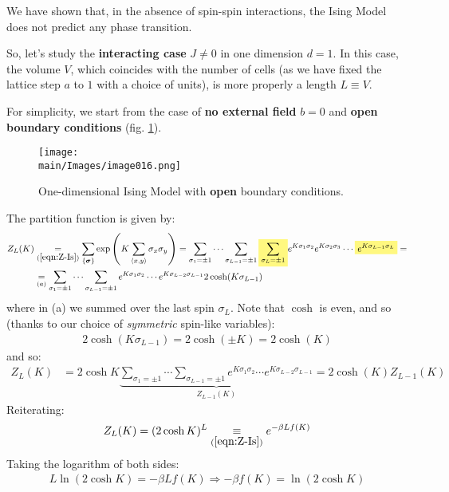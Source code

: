 \documentclass[../../main.tex]{subfiles}
\begin{document}

We have shown that, in the absence of spin-spin interactions, the Ising Model does not predict any phase transition. %

\medskip

So, let's study the \textbf{interacting case} $J\neq 0$ in one dimension $d=1$. In this case, the volume $V$, which coincides with the number of cells (as we have fixed the lattice step $a$ to $1$ with a choice of units), is more properly a length $L \equiv V$.

\medskip

For simplicity, we start from the case of \textbf{no external field} $b=0$ and \textbf{open boundary conditions} (fig. \ref{fig:obcd1}).   

\begin{figure}[H]
    \centering
    \texttt{[image: \\main/Images/image016.png]}
    \caption{One-dimensional Ising Model with \textbf{open} boundary conditions.\label{fig:obcd1}}
\end{figure}

The partition function is given by:
\begin{align*}
    Z_L(K) &\underset{(\ref{eqn:Z-Is})}{=} 
    \sum_{\{\bm{\sigma}\}}\exp\left( K \sum_{\langle x,y \rangle} \sigma_x \sigma_y \right) =
    \sum_{\sigma_1 = \pm 1} \cdots \sum_{\sigma_{L-1}=\pm 1} \hlc{Yellow}{\sum_{\sigma_L = \pm 1}} e^{K \sigma_1 \sigma_2} e^{K \sigma_2 \sigma_3} \cdots \hlc{Yellow}{e^{K \sigma_{L-1} \sigma_L}} =\\
    &\underset{(a)}{=}  \sum_{\sigma_1 = \pm 1} \cdots \sum_{\sigma_{L-1}=\pm 1} e^{K \sigma_1 \sigma_2} \cdots e^{K \sigma_{L-2} \sigma_{L-1}} 2 \cosh (K \sigma_{L-1})
\end{align*}
where in (a) we summed over the last spin $\sigma_L$. Note that $\cosh$ is even, and so (thanks to our choice of \textit{symmetric} spin-like variables):
\begin{align*}
   2\cosh(K \sigma_{L-1}) = 2 \cosh(\pm K)  = 2 \cosh(K)
\end{align*}
and so:
\begin{align*}
    Z_L(K) &= 2\cosh K  \underbrace{\sum_{\sigma_1 = \pm 1} \cdots \sum_{\sigma_{L-1}=\pm 1} e^{K \sigma_1 \sigma_2} \cdots e^{K \sigma_{L-2} \sigma_{L-1}} }_{Z_{L-1}(K)}  = 2\cosh (K) Z_{L-1}(K)
\end{align*}
Reiterating:
\begin{align}\label{eqn:Z-open-boundaries}
    Z_L(K) = (2\cosh K)^L \underset{(\ref{eqn:Z-Is})}{\equiv}  e^{- \beta L f(K)} 
\end{align}
Taking the logarithm of both sides:
\begin{align*}
    L \ln (2 \cosh K) = -\beta L f(K) \Rightarrow -\beta f(K) = \ln(2\cosh K)
\end{align*}
\end{document}

